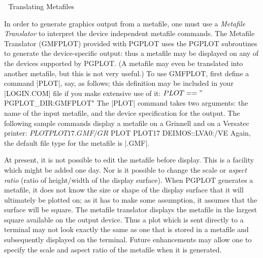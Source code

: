 
\beginsection Translating Metafiles 

In order to generate graphics output from a metafile, one must use a
{\it Metafile Translator\/} to interpret the device independent metafile
commands. The Metafile Translator (GMFPLOT) provided with PGPLOT uses
the PGPLOT subroutines to generate the device-specific output: thus a
meta\-file may be displayed on any of the devices supported by PGPLOT. (A
metafile may even be translated into another metafile, but this is not
very useful.) To use GMFPLOT, first define a command |PLOT|, say, as
follows; this definition may be included in your |LOGIN.COM| file if you
make extensive use of it: 
\begintt
$ PLOT == "$PGPLOT_DIR:GMFPLOT"
\endtt
The |PLOT| command takes two arguments: the name of the input metafile,
and the device specification for the output. The following sample
commands display a metafile on a Grinnell and on a Versatec printer: 
\begintt
$ PLOT PLOT17.GMF /GR
$ PLOT PLOT17 DEIMOS::LVA0:/VE
\endtt
Again, the default file type for the metafile is |.GMF|.

At present, it is not possible to edit the metafile before display. This
is a facility which might be added one day. Nor is it possible to change
the scale or {\it aspect ratio\/} (ratio of height/width of the display
surface).  When PGPLOT generates a metafile, it does not know the size
or shape of the display surface that it will ultimately be plotted on;
as it has to make some assumption, it assumes that the surface will be
square. The metafile translator displays the metafile in the largest
square available on the output device. Thus a plot which is sent
directly to a terminal may not look exactly the same as one that is
stored in a metafile and subsequently displayed on the terminal. Future
enhancements may allow one to specify the scale and aspect ratio of the
metafile when it is generated. 

\endchapter
